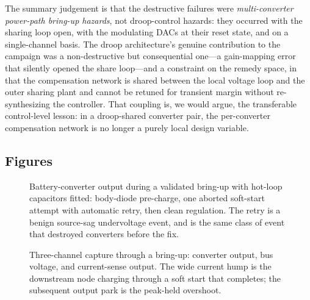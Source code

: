 The summary judgement is that the destructive failures were \emph{multi-converter
power-path bring-up hazards}, not droop-control hazards: they occurred with the
sharing loop open, with the modulating DACs at their reset state, and on a
single-channel basis. The droop architecture's genuine contribution to the campaign
was a non-destructive but consequential one---a gain-mapping error that silently
opened the share loop---and a constraint on the remedy space, in that the
compensation network is shared between the local voltage loop and the outer sharing
plant and cannot be retuned for transient margin without re-synthesizing the
controller. That coupling is, we would argue, the transferable control-level lesson:
in a droop-shared converter pair, the per-converter compensation network is no longer
a purely local design variable.

\subsection{Figures}
\label{sec:bringup:figures}


\begin{figure}[H]
\centering
\caption{Battery-converter output during a validated bring-up with hot-loop
capacitors fitted: body-diode pre-charge, one aborted soft-start attempt with
automatic retry, then clean regulation. The retry is a benign source-sag
undervoltage event, and is the same class of event that destroyed converters
before the fix.\label{fig:scope-vout}}
\end{figure}

\begin{figure}[H]
\centering
\caption{Three-channel capture through a bring-up: converter output, bus voltage,
and current-sense output. The wide current hump is the downstream node charging
through a soft start that completes; the subsequent output park is the peak-held
overshoot.\label{fig:scope-triple}}
\end{figure}

